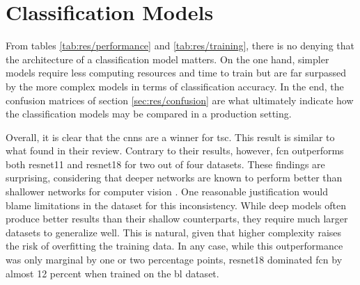 \section{Classification Models}

From tables \ref{tab:res/performance} and \ref{tab:res/training}, there is no denying that the architecture of a classification model matters. On the one hand, simpler models require less computing resources and time to train but are far surpassed by the more complex models in terms of classification accuracy. In the end, the confusion matrices of section \ref{sec:res/confusion} are what ultimately indicate how the classification models may be compared in a production setting. 



Overall, it is clear that the \acrshort{cnn}s are a winner for \acrlong{tsc}. This result is similar to what \textcite{fawaz2018} found in their review. Contrary to their results, however, \acrshort{fcn} outperforms both \acrshort{resnet11} and \acrshort{resnet18} for two out of four datasets. These findings are surprising, considering that deeper networks are known to perform better than shallower networks for computer vision \cite{he2015}. One reasonable justification would blame limitations in the dataset for this inconsistency. While deep models often produce better results than their shallow counterparts, they require much larger datasets to generalize well. This is natural, given that higher complexity raises the risk of overfitting the training data.
In any case, while this outperformance was only marginal by one or two percentage points, \acrshort{resnet18} dominated \acrshort{fcn} by almost 12 percent when trained on the \acrshort{bl} dataset. 

